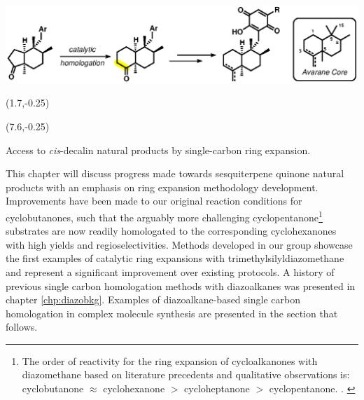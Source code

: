 \begin{Scheme}[H]
  \centering
  \includegraphics[scale=0.8]{chp_singlecarbon/images/strategydecalin}
\begin{textblock}{1}(1.7,-0.25)  \end{textblock}
\begin{textblock}{1}(7.6,-0.25)  \end{textblock}
  \caption{Access to \textit{cis}-decalin natural products by single-carbon ring
  expansion.}
  \label{sch:strategydecalin}
\end{Scheme}
 This chapter will discuss progress made towards sesquiterpene
 quinone natural products with an emphasis on ring expansion methodology development.
 Improvements have been
made to our original reaction conditions for cyclobutanones, such that the
arguably more challenging cyclopentanone\footnote{The order of reactivity for
the ring expansion of cycloalkanones with diazomethane based on literature
precedents and qualitative observations is: cyclobutanone $\approx$
cyclohexanone $>$ cycloheptanone $>$ cyclopentanone. . \label{ref:cgutsche}}
substrates are now readily homologated to the corresponding cyclohexanones with high yields and
regioselectivities. Methods developed in our group showcase the first examples
of catalytic ring expansions with trimethylsilyldiazomethane and
represent a significant improvement over existing protocols. A history of previous
single carbon homologation methods with diazoalkanes was presented in chapter \ref{chp:diazobkg}.
Examples of diazoalkane-based single carbon homologation in complex molecule synthesis are presented
in the section that follows.

\pagebreak

